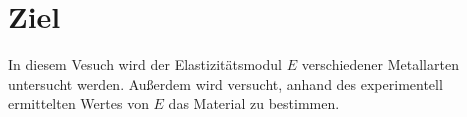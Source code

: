 \section{Ziel}
\label{sec:Ziel}

In diesem Vesuch wird der Elastizitätsmodul $E$ verschiedener Metallarten untersucht werden.
Außerdem wird versucht, anhand des experimentell ermittelten Wertes von $E$ das Material zu bestimmen.